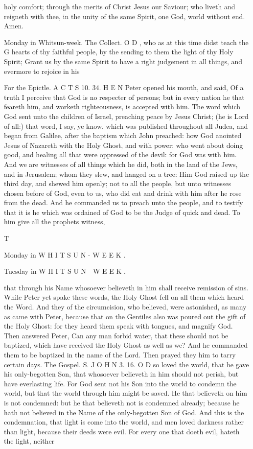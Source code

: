 holy comfort; through the merits of Christ Jesus our Saviour; who liveth and reigneth with thee, in the unity of the same Spirit, one God, world without end. Amen.

Monday in Whitsun-week. The Collect. O D , who as at this time didst teach the G hearts of thy faithful people, by the sending to them the light of thy Holy Spirit; Grant us by the same Spirit to have a right judgement in all things, and evermore to rejoice in his

For the Epictle. A C T S 10. 34. H E N Peter opened his mouth, and said, Of a truth I perceive that God is no respecter of persons; but in every nation he that feareth him, and worketh righteousness, is accepted with him. The word which God sent unto the children of Israel, preaching peace by Jesus Christ; (he is Lord of all:) that word, I say, ye know, which was published throughout all Judea, and began from Galilee, after the baptism which John preached: how God anointed Jesus of Nazareth with the Holy Ghost, and with power; who went about doing good, and healing all that were oppressed of the devil: for God was with him. And we are witnesses of all things which he did, both in the land of the Jews, and in Jerusalem; whom they slew, and hanged on a tree: Him God raised up the third day, and shewed him openly; not to all the people, but unto witnesses chosen before of God, even to us, who did eat and drink with him after he rose from the dead. And he commanded us to preach unto the people, and to testify that it is he which was ordained of God to be the Judge of quick and dead. To him give all the prophets witness,

T

Monday in W H I T S U N - W E E K .

Tuesday in W H I T S U N - W E E K .

that through his Name whosoever believeth in him shall receive remission of sins. While Peter yet spake these words, the Holy Ghost fell on all them which heard the Word. And they of the circumcision, who believed, were astonished, as many as came with Peter, because that on the Gentiles also was poured out the gift of the Holy Ghost: for they heard them speak with tongues, and magnify God. Then answered Peter, Can any man forbid water, that these should not be baptized, which have received the Holy Ghost as well as we? And he commanded them to be baptized in the name of the Lord. Then prayed they him to tarry certain days. The Gospel. S. J O H N 3. 16. O D so loved the world, that he gave his only-begotten Son, that whosoever believeth in him should not perish, but have everlasting life. For God sent not his Son into the world to condemn the world, but that the world through him might be saved. He that believeth on him is not condemned: but he that believeth not is condemned already; because he hath not believed in the Name of the only-begotten Son of God. And this is the condemnation, that light is come into the world, and men loved darkness rather than light, because their deeds were evil. For every one that doeth evil, hateth the light, neither

